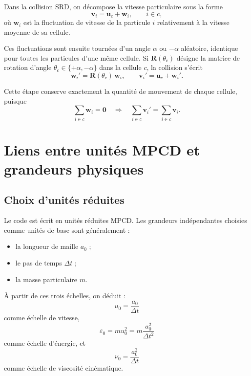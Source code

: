 \documentclass[11pt,a4paper]{article}
\begin{document}
Dans la collision SRD, on décompose la vitesse particulaire sous la forme
\begin{equation}
 \bm{v}_i = \bm{u}_c + \bm{w}_i,
 \qquad i\in c,
\end{equation}
où $\bm{w}_i$ est la fluctuation de vitesse de la particule $i$ relativement à la vitesse moyenne de sa cellule.

Ces fluctuations sont ensuite tournées d'un angle $\alpha$ ou $-\alpha$ aléatoire, identique pour toutes les particules d'une même cellule. Si $\mathbf{R}(\theta_c)$ désigne la matrice de rotation d'angle $\theta_c\in\{+\alpha,-\alpha\}$ dans la cellule $c$, la collision s'écrit
\begin{equation}
 \bm{w}_i' = \mathbf{R}(\theta_c)\,\bm{w}_i,
 \qquad
 \bm{v}_i' = \bm{u}_c + \bm{w}_i'.
\end{equation}

Cette étape conserve exactement la quantité de mouvement de chaque cellule, puisque
\begin{equation}
 \sum_{i\in c} \bm{w}_i = \bm{0}
 \quad \Longrightarrow \quad
 \sum_{i\in c} \bm{v}_i' = \sum_{i\in c} \bm{v}_i.
\end{equation}

\section{Liens entre unités MPCD et grandeurs physiques}

\subsection{Choix d'unités réduites}

Le code est écrit en unités réduites MPCD. Les grandeurs indépendantes choisies comme unités de base sont généralement :
\begin{itemize}
  \item la longueur de maille $a_0$ ;
  \item le pas de temps $\Delta t$ ;
  \item la masse particulaire $m$.
\end{itemize}

À partir de ces trois échelles, on déduit :
\begin{equation}
 u_0 = \frac{a_0}{\Delta t}
\end{equation}
comme échelle de vitesse,
\begin{equation}
 \varepsilon_0 = m u_0^2 = m\frac{a_0^2}{\Delta t^2}
\end{equation}
comme échelle d'énergie, et
\begin{equation}
 \nu_0 = \frac{a_0^2}{\Delta t}
\end{equation}
comme échelle de viscosité cinématique.
\end{document}
